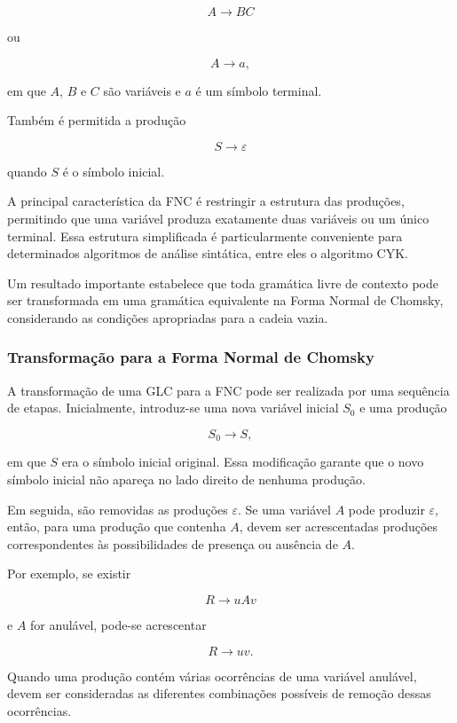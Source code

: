 \documentclass[
  brazilian,
  letterpaper,
]{book}
\theoremstyle{plain}
\theoremstyle{definition}
\theoremstyle{remark}
\begin{document}
\[
A\rightarrow BC
\]

ou

\[
A\rightarrow a,
\]

em que \(A\), \(B\) e \(C\) são variáveis e \(a\) é um símbolo terminal.

Também é permitida a produção

\[
S\rightarrow\varepsilon
\]

quando \(S\) é o símbolo inicial.

A principal característica da FNC é restringir a estrutura das
produções, permitindo que uma variável produza exatamente duas variáveis
ou um único terminal. Essa estrutura simplificada é particularmente
conveniente para determinados algoritmos de análise sintática, entre
eles o algoritmo CYK.

Um resultado importante estabelece que toda gramática livre de contexto
pode ser transformada em uma gramática equivalente na Forma Normal de
Chomsky, considerando as condições apropriadas para a cadeia vazia.

\subsubsection{Transformação para a Forma Normal de
Chomsky}\label{transformauxe7uxe3o-para-a-forma-normal-de-chomsky}

A transformação de uma GLC para a FNC pode ser realizada por uma
sequência de etapas. Inicialmente, introduz-se uma nova variável inicial
\(S_0\) e uma produção

\[
S_0\rightarrow S,
\]

em que \(S\) era o símbolo inicial original. Essa modificação garante
que o novo símbolo inicial não apareça no lado direito de nenhuma
produção.

Em seguida, são removidas as produções \(\varepsilon\). Se uma variável
\(A\) pode produzir \(\varepsilon\), então, para uma produção que
contenha \(A\), devem ser acrescentadas produções correspondentes às
possibilidades de presença ou ausência de \(A\).

Por exemplo, se existir

\[
R\rightarrow uAv
\]

e \(A\) for anulável, pode-se acrescentar

\[
R\rightarrow uv.
\]

Quando uma produção contém várias ocorrências de uma variável anulável,
devem ser consideradas as diferentes combinações possíveis de remoção
dessas ocorrências.
\end{document}
